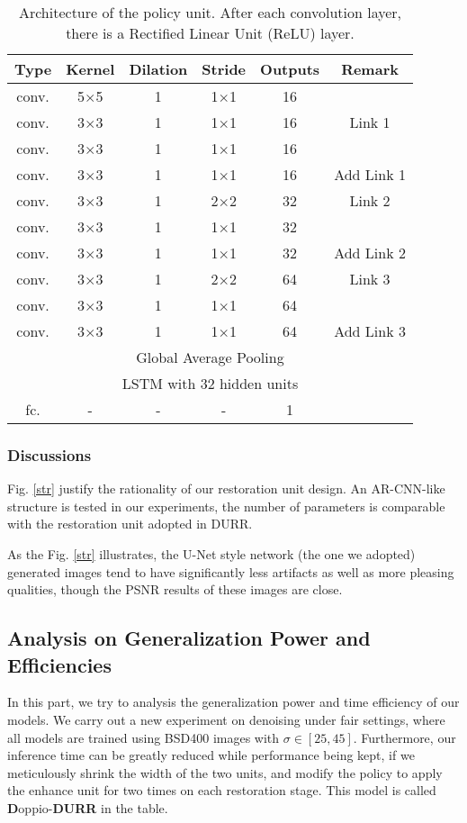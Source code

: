\documentclass{article} %
\begin{document}
\begin{table}[htp!]
	\caption{Architecture of the policy unit. After each convolution layer, there is a Rectified Linear Unit (ReLU) layer.}
	\label{archpoly}
	
	\centering
	\begin{tabular}{cccccc}
		\toprule
		Type & Kernel & Dilation & Stride & Outputs & Remark\\
		\hline\hline
		conv.& 5$\times$5& 1 & 1$\times$1 &16\\
		conv.& 3$\times$3& 1 & 1$\times$1 &16& Link 1\\
		conv.& 3$\times$3& 1 & 1$\times$1 &16\\
		conv.& 3$\times$3& 1 & 1$\times$1 &16& Add Link 1\\
		\hline
		conv.& 3$\times$3& 1 & 2$\times$2 &32&Link 2\\
		
		conv.& 3$\times$3& 1 & 1$\times$1 &32\\
		conv.& 3$\times$3& 1 & 1$\times$1 &32&Add Link 2\\
		\hline
		conv.& 3$\times$3& 1 & 2$\times$2 &64&Link 3\\
		
		conv.& 3$\times$3& 1 & 1$\times$1 &64\\
		conv.& 3$\times$3& 1 & 1$\times$1 &64&Add Link 3\\
		\hline
		\multicolumn{6}{c}{Global Average Pooling}\\
		\hline	
		\multicolumn{6}{c}{LSTM with 32 hidden units}\\
		\hline	
		fc.  & - &- &- &1&\\
		\hline
	\end{tabular}
\end{table}

\subsubsection{Discussions}

Fig. \ref{str} justify the rationality of our restoration unit design.
An AR-CNN-like structure is tested in our experiments, the
number of parameters is comparable with the restoration unit adopted in DURR.

As the Fig. \ref{str} illustrates, the U-Net style network
(the one we adopted) generated images tend to have significantly
less artifacts as well as more pleasing qualities, though the
PSNR results of these images are close.

\subsection{Analysis on Generalization Power and Efficiencies}
In this part, we try to analysis the generalization power and
time efficiency of our models. We carry out a new experiment
on denoising under fair settings, where all models
are trained using BSD400 images with $\sigma \in [25, 45]$.
Furthermore, our inference time can be greatly reduced
while performance being kept, if we meticulously shrink the width
of the two units, and modify the policy to apply the enhance unit for
two times on each restoration stage. This model is called
\textbf{D}oppio-\textbf{DURR} in the table.
\end{document}

